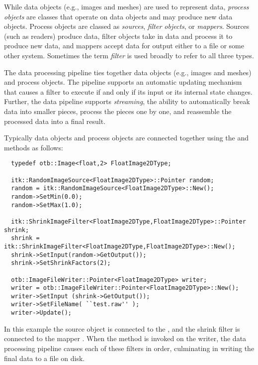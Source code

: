 While data objects (e.g., images and meshes) are used to represent data,
\emph{process objects} are classes that operate on data objects and may
produce new data objects. Process objects are classed as
\emph{sources}, \emph{filter objects}, or \emph{mappers}.  Sources (such as
readers) produce data, filter objects take in data and process it to produce
new data, and mappers accept data for output either to a file or
some other system.  Sometimes the term \emph{filter} is used broadly
to refer to all three types.


The data processing pipeline ties together data objects (e.g., images and
meshes) and process objects. The pipeline supports an automatic updating
mechanism that causes a filter to execute if and only if its input 
or its internal state changes. Further, the data pipeline supports
\emph{streaming}, the ability to automatically break data into smaller
pieces, process the pieces one by one, and reassemble the processed data into
a final result.

Typically data objects and process objects are connected together using the
 and  methods as follows:

\small
\begin{verbatim}
  typedef otb::Image<float,2> FloatImage2DType;

  itk::RandomImageSource<FloatImage2DType>::Pointer random;
  random = itk::RandomImageSource<FloatImage2DType>::New();
  random->SetMin(0.0);
  random->SetMax(1.0);

  itk::ShrinkImageFilter<FloatImage2DType,FloatImage2DType>::Pointer shrink;
  shrink = itk::ShrinkImageFilter<FloatImage2DType,FloatImage2DType>::New();
  shrink->SetInput(random->GetOutput());
  shrink->SetShrinkFactors(2);

  otb::ImageFileWriter::Pointer<FloatImage2DType> writer;
  writer = otb::ImageFileWriter::Pointer<FloatImage2DType>::New();
  writer->SetInput (shrink->GetOutput());
  writer->SetFileName( ``test.raw'' );
  writer->Update();
\end{verbatim}
\normalsize 

In this example the source object  is connected
to the , and the shrink filter is connected to
the mapper . When the  method is
invoked on the writer, the data processing pipeline causes each of these
filters in order, culminating in writing the final data to a file on disk.

